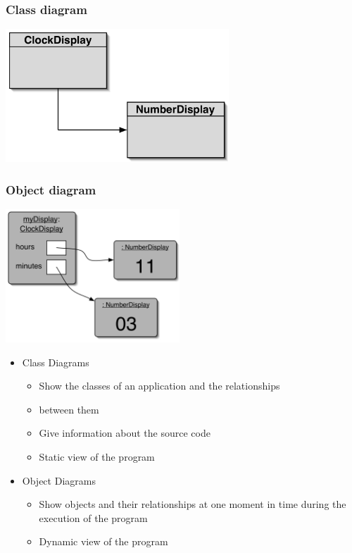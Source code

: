 \documentclass{beamer}
\begin{document}
\begin{frame}
\frametitle{Class diagram}
\begin{center}
\includegraphics[height=5cm, keepaspectratio]{./figures/class}
\end{center}
\end{frame}

\begin{frame}
\frametitle{Object diagram}
\begin{center}
\includegraphics[height=5cm, keepaspectratio]{./figures/object}
\end{center}
\end{frame}

\begin{frame}
\begin{itemize}
\item Class Diagrams

\begin{itemize}
\item Show the classes of an application and the relationships
\item between them
\item Give information about the source code 
\item Static view of the program
\end{itemize}
\item Object Diagrams

\begin{itemize}
\item Show objects and their relationships at one moment in time during the execution of the program 
\item Dynamic view of the program
\end{itemize}
\end{itemize}

\end{frame}
\end{document}
